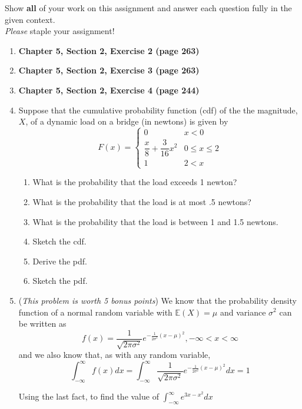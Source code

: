 \documentclass[11pt]{article}
\newcommand{\ben}{\begin{enumerate}}
\newcommand{\een}{\end{enumerate}}
\begin{document}
\pagestyle{fancy} 

Show \textbf{all} of your work on this assignment and answer each question fully in the given context. \\

\emph{Please} staple your assignment! \\

\ben


\item \textbf{Chapter 5, Section 2, Exercise 2 (page 263)}

\item \textbf{Chapter 5, Section 2, Exercise 3 (page 263)}

\item \textbf{Chapter 5, Section 2, Exercise 4 (page 244)}

 
\item Suppose that the cumulative probability function (cdf)
of the the magnitude, $X$, of a dynamic load on a bridge (in newtons) is given by
$$
F(x) = \begin{cases}
     0 & x < 0 \\
     \dfrac{x}{8} + \dfrac{3}{16}x^2 & 0 \leq x \leq 2\\
     1 & 2 < x
\end{cases}
$$
\ben
\item What is the probability that the load exceeds 1 newton?

\item What is the probability that the load is at most .5 newtons?

\item What is the probability that the load is between 1 and 1.5 newtons.

\item Sketch the cdf.

\item Derive the pdf.

\item Sketch the pdf.
\een 

 \item (\textit{This problem is worth 5 bonus points})
    We know that the probability density function of a normal random variable with $\mathbb{E}(X) = \mu$ and variance $\sigma^2$ can be written as
    $$
    f(x) = \frac{1}{\sqrt{2 \pi \sigma^2}} e^{-\frac{1}{2 \sigma^2 } (x - \mu)^2}, -\infty < x < \infty
    $$
    and we also know that, as with any random variable, 
    $$
    \int_{-\infty}^{\infty} f(x) dx  = \int_{-\infty}^{\infty} \frac{1}{\sqrt{2 \pi \sigma^2}} e^{-\frac{1}{2 \sigma^2 } (x - \mu)^2} dx  = 1
    $$

    Using the last fact, to find the value of $ \int_{-\infty}^{\infty} e^{3x -x^2} dx $
\een
\end{document}
